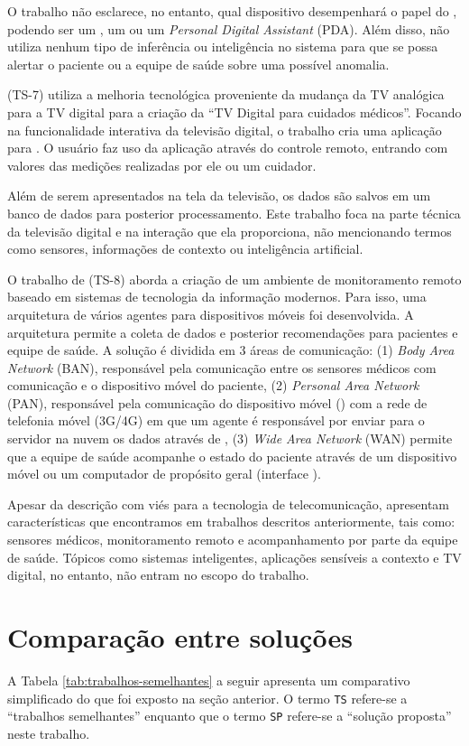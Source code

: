 O trabalho não esclarece, no entanto, qual dispositivo desempenhará o papel do
\gateway[], podendo ser um \tablet[], um \smartphone[] ou um \textit{Personal
Digital Assistant} (PDA). Além disso, não utiliza nenhum tipo de inferência ou
inteligência no sistema para que se possa alertar o paciente ou a equipe de
saúde sobre uma possível anomalia.

 (TS-7) utiliza a melhoria tecnológica proveniente da
mudança da TV analógica para a TV digital para a criação da ``TV Digital para
cuidados médicos''. Focando na funcionalidade interativa da televisão digital,
o trabalho cria uma aplicação para \stb[]. O usuário faz uso da aplicação através
do controle remoto, entrando com valores das medições realizadas por ele ou um
cuidador. 

Além de serem apresentados na tela da televisão, os dados são salvos
em um banco de dados para posterior processamento. Este trabalho foca na parte
técnica da televisão digital e na interação que ela proporciona, não
mencionando termos como sensores, informações de contexto ou inteligência
artificial.

O trabalho de  (TS-8) aborda a criação de um ambiente de
monitoramento remoto baseado em sistemas de tecnologia da informação modernos.
Para isso, uma arquitetura de vários agentes para dispositivos móveis foi
desenvolvida. A arquitetura permite a coleta de dados e posterior recomendações
para pacientes e equipe de saúde. A solução é dividida em 3 áreas de
comunicação: (1) \textit{Body Area Network} (BAN), responsável pela comunicação
entre os sensores médicos com comunicação \bluetooth[] e o dispositivo móvel do
paciente,  (2) \textit{Personal Area Network} (PAN), responsável pela
comunicação do dispositivo móvel (\smartphone) com a rede de telefonia móvel
(3G/4G) em que um agente é responsável por enviar para o servidor na nuvem os dados
através de \webservices[],  (3) \textit{Wide Area Network} (WAN) permite que a equipe
de saúde acompanhe o estado do paciente através de um dispositivo móvel ou um
computador de propósito geral (interface \web).

Apesar da descrição com viés para a tecnologia de telecomunicação,
 apresentam características que encontramos em
trabalhos descritos anteriormente, tais como: sensores médicos, monitoramento
remoto e acompanhamento por parte da equipe de saúde. Tópicos como sistemas
inteligentes, aplicações sensíveis a contexto e TV digital, no entanto, não
entram no escopo do trabalho.

\section{Comparação entre soluções} \label{sec:comparacao}

A Tabela \ref{tab:trabalhos-semelhantes} a seguir apresenta um comparativo
simplificado do que foi exposto na seção anterior. O termo \texttt{TS} refere-se
a ``trabalhos semelhantes'' enquanto que o termo \texttt{SP} refere-se a
``solução proposta'' neste trabalho.


